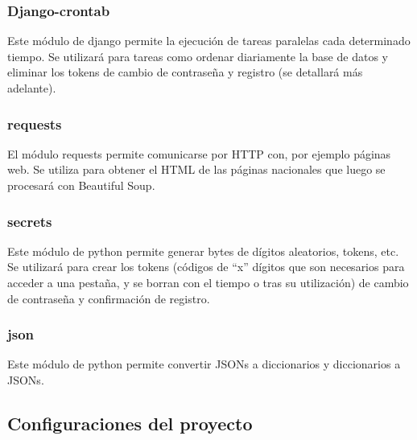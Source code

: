 \subsubsection{Django-crontab}

Este módulo de django permite la ejecución de tareas paralelas cada determinado tiempo. Se utilizará para tareas como ordenar diariamente la base de datos y eliminar los tokens de cambio de contraseña y registro (se detallará más adelante).\\

\subsubsection{requests}

El módulo requests permite comunicarse por HTTP con, por ejemplo páginas web. Se utiliza para obtener el HTML de las páginas nacionales que luego se procesará con Beautiful Soup.\\

\subsubsection{secrets}

Este módulo de python permite generar bytes de dígitos aleatorios, tokens, etc. Se utilizará para crear los tokens (códigos de “x” dígitos que son necesarios para acceder a una pestaña, y se borran con el tiempo o tras su utilización) de cambio de contraseña y confirmación de registro.\\

\subsubsection{json}

Este módulo de python permite convertir JSONs a diccionarios y diccionarios a JSONs.

\subsection{Configuraciones del proyecto}

